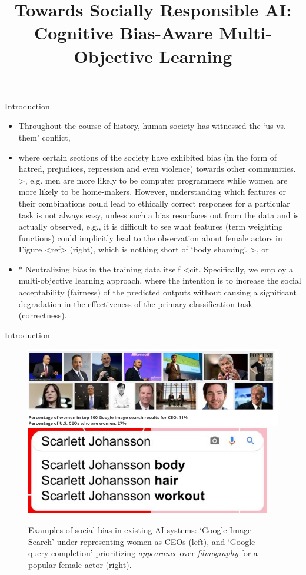 \documentclass{beamer}
\title{Towards Socially Responsible AI: Cognitive Bias-Aware Multi-Objective Learning
}
\begin{document}
\normalsize
\maketitle
%
\begin{frame}{Introduction}
%
\begin{itemize}
\item
Throughout the course of history, human society has witnessed the `us vs. them' conflict,
\item
where certain sections of the society have exhibited bias (in the form of hatred, prejudices, repression and even violence) towards other communities. >, e.g. men are more likely to be computer programmers while women are more likely to be home-makers. However, understanding which features or their combinations could lead to ethically correct responses for a particular task is not always easy, unless such a bias resurfaces out from the data and is actually observed, e.g., it is difficult to see what features (term weighting functions) could implicitly lead to the observation about female actors in Figure <ref> (right), which is nothing short of `body shaming'. >, or
\item
  * Neutralizing bias in the training data itself <cit. Specifically, we employ a multi-objective learning approach, where the intention is to increase the social acceptability (fairness) of the predicted outputs without causing a significant degradation in the effectiveness of the primary classification task (correctness).
\end{itemize}
\end{frame}
%
\begin{frame}{Introduction}
%
\begin{figure}[t]
    \centering
    \includegraphics[width=.75\columnwidth]{ceo.png}
    \includegraphics[width=.24\columnwidth]{qc.png}
    \caption{Examples of social bias in existing AI systems: `Google Image Search' under-representing women as CEOs (left), and `Google query completion' prioritizing \emph{appearance} over \emph{filmography} for a popular female actor (right).}
    \label{fig:bias-in-existing-AI-tools}
\end{figure}
\end{frame}
\end{document}
